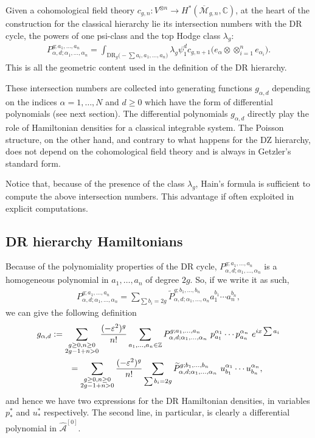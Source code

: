 \documentclass[pdftex]{sigma}
\numberwithin{equation}{section}
\newcommand{\mbZ}{\mathbb Z}
\newcommand{\mbC}{\mathbb C}
\newcommand{\oM}{\overline{\mathcal M}}
\newcommand{\<}{\left<}
\renewcommand{\>}{\right>}
\newcommand{\eps}{\varepsilon}
\newcommand{\hcA}{\widehat{\mathcal A}}
\newcommand{\DR}{\mathrm{DR}}
\begin{document}
Given a cohomological f\/ield theory $c_{g,n}\colon V^{\otimes n} \to H^*(\oM_{g,n},\mbC)$, at the heart of the construction for the classical hierarchy lie its intersection numbers with the DR cycle, the powers of one psi-class and the top Hodge class $\lambda_g$:
\begin{gather*}P_{\alpha,d;\alpha_1,\dots,\alpha_n}^{g;a_1,\dots,a_n}=\int_{\DR_g\big({-}\sum a_i,a_1,\dots,a_n\big)}\lambda_g \psi_1^d c_{g,n+1}\big(e_\alpha\otimes\otimes_{i=1}^n e_{\alpha_i}\big).\end{gather*}
This is all the geometric content used in the def\/inition of the DR hierarchy.

These intersection numbers are collected into generating functions $g_{\alpha,d}$ depending on the indices $\alpha=1,\dots,N$ and $d\ge 0$ which have the form of dif\/ferential polynomials (see next section). The dif\/ferential polynomials $g_{\alpha,d}$ directly play the role of Hamiltonian densities for a classical integrable system. The Poisson structure, on the other hand, and contrary to what happens for the DZ hierarchy, does not depend on the cohomological f\/ield theory and is always in Getzler's standard form.

Notice that, because of the presence of the class $\lambda_g$, Hain's formula is suf\/f\/icient to compute the above intersection numbers. This advantage if often exploited in explicit computations.

\subsection{DR hierarchy Hamiltonians} Because of the polynomiality properties of the DR cycle, $P_{\alpha,d;\alpha_1,\dots,\alpha_n}^{g;a_1,\dots,a_n}$ is a homogeneous polynomial in $a_1,\dots,a_n$ of degree $2g$. So, if we write it as such, \begin{gather*}P_{\alpha,d;\alpha_1,\dots,\alpha_n}^{g;a_1,\dots,a_n} = \sum_{\sum b_i= 2g} \widetilde{P}_{\alpha,d;\alpha_1,\dots,\alpha_n}^{g;b_1,\dots,b_n} a_1^{b_1}\cdots a_n^{b_n}, \end{gather*}
we can give the following def\/inition
\begin{gather*} g_{\alpha,d}:=\sum_{\substack{g\ge 0,n\ge 0\\2g-1+n>0}}\frac{(-\eps^2)^g}{n!}\sum_{a_1,\dots,a_n\in\mbZ}
P_{\alpha,d;\alpha_1,\dots,\alpha_n}^{g;a_1,\dots,a_n}\ p^{\alpha_1}_{a_1}\cdots p^{\alpha_n}_{a_n}\ e^{ix\sum a_i} \\
\hphantom{g_{\alpha,d}}{} = \sum_{\substack{g\ge 0,n\ge 0\\2g-1+n>0}}\frac{(-\eps^2)^g}{n!}\sum_{\sum b_i = 2g}
\widetilde{P}_{\alpha,d;\alpha_1,\dots,\alpha_n}^{g;b_1,\dots,b_n}\ u^{\alpha_1}_{b_1}\cdots u^{\alpha_n}_{b_n},
\end{gather*}
and hence we have two expressions for the DR Hamiltonian densities, in variables $p^*_*$ and $u^*_*$ respectively. The second line, in particular, is clearly a dif\/ferential polynomial in $\hcA^{[0]}$.
\end{document}
